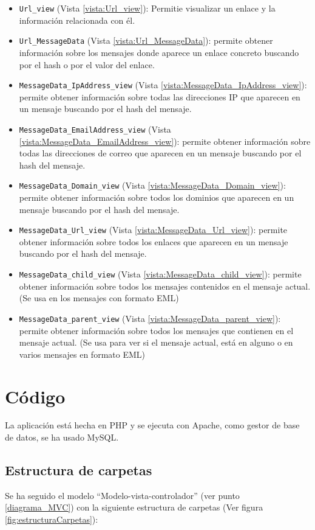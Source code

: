 \begin{itemize}
    \item \verb!Url_view! (Vista \ref{vista:Url_view}): Permitie visualizar un enlace y la información relacionada con él.
    \item \verb!Url_MessageData! (Vista \ref{vista:Url_MessageData}): permite obtener información sobre los mensajes donde aparece un enlace concreto buscando por el hash o por el valor del enlace.
    \item \verb!MessageData_IpAddress_view! (Vista \ref{vista:MessageData_IpAddress_view}): permite obtener información sobre todas las direcciones IP que aparecen en un mensaje buscando por el hash del mensaje.
    \item \verb!MessageData_EmailAddress_view! (Vista \ref{vista:MessageData_EmailAddress_view}): permite obtener información sobre todas las direcciones de correo que aparecen en un mensaje buscando por el hash del mensaje.
    \item \verb!MessageData_Domain_view! (Vista \ref{vista:MessageData_Domain_view}): permite obtener información sobre todos los dominios que aparecen en un mensaje buscando por el hash del mensaje.
    \item \verb!MessageData_Url_view! (Vista \ref{vista:MessageData_Url_view}): permite obtener información sobre todos los enlaces que aparecen en un mensaje buscando por el hash del mensaje.
    \item \verb!MessageData_child_view! (Vista \ref{vista:MessageData_child_view}): permite obtener información sobre todos los mensajes contenidos en el mensaje actual. (Se usa en los mensajes con formato EML)
    \item \verb!MessageData_parent_view! (Vista \ref{vista:MessageData_parent_view}): permite obtener información sobre todos los mensajes que contienen en el mensaje actual. (Se usa para ver si el mensaje actual, está en alguno o en varios mensajes en formato EML)    
\end{itemize}

\section{Código}
La aplicación está hecha en PHP y se ejecuta con Apache, como gestor de base de datos, se ha usado MySQL. 

\subsection{Estructura de carpetas}
Se ha seguido el modelo “Modelo-vista-controlador” (ver punto \ref{diagrama_MVC}) con la siguiente estructura de carpetas (Ver figura \ref{fig:estructuraCarpetas}): 

